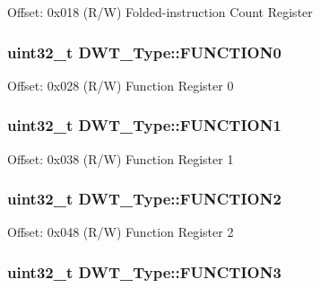 Offset\-: 0x018 (R/\-W) Folded-\/instruction Count Register \hypertarget{structDWT__Type_a5fbd9947d110cc168941f6acadc4a729}{
\subsubsection[{F\-U\-N\-C\-T\-I\-O\-N0}]{ uint32\-\_\-t D\-W\-T\-\_\-\-Type\-::\-F\-U\-N\-C\-T\-I\-O\-N0}}\label{structDWT__Type_a5fbd9947d110cc168941f6acadc4a729}
Offset\-: 0x028 (R/\-W) Function Register 0 \hypertarget{structDWT__Type_a3345a33476ee58e165447a3212e6d747}{
\subsubsection[{F\-U\-N\-C\-T\-I\-O\-N1}]{ uint32\-\_\-t D\-W\-T\-\_\-\-Type\-::\-F\-U\-N\-C\-T\-I\-O\-N1}}\label{structDWT__Type_a3345a33476ee58e165447a3212e6d747}
Offset\-: 0x038 (R/\-W) Function Register 1 \hypertarget{structDWT__Type_acba1654190641a3617fcc558b5e3f87b}{
\subsubsection[{F\-U\-N\-C\-T\-I\-O\-N2}]{ uint32\-\_\-t D\-W\-T\-\_\-\-Type\-::\-F\-U\-N\-C\-T\-I\-O\-N2}}\label{structDWT__Type_acba1654190641a3617fcc558b5e3f87b}
Offset\-: 0x048 (R/\-W) Function Register 2 \hypertarget{structDWT__Type_a80bd242fc05ca80f9db681ce4d82e890}{
\subsubsection[{F\-U\-N\-C\-T\-I\-O\-N3}]{ uint32\-\_\-t D\-W\-T\-\_\-\-Type\-::\-F\-U\-N\-C\-T\-I\-O\-N3}}\label{structDWT__Type_a80bd242fc05ca80f9db681ce4d82e890}
